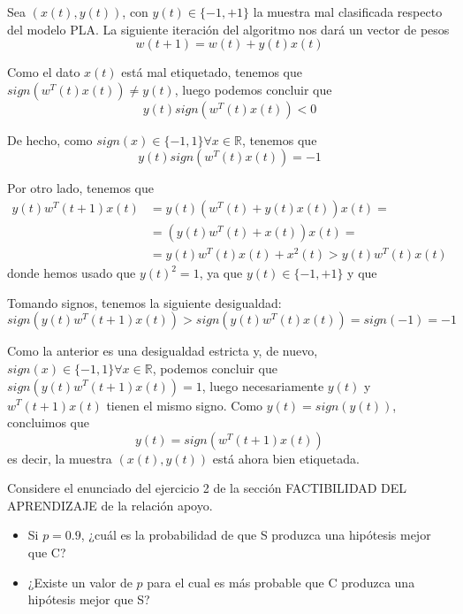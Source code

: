 \documentclass[a4paper, 11pt]{article}
\begin{document}
    \begin{solucion}
        Sea $(x(t), y(t))$, con $y(t) \in \{-1, +1\}$ la muestra mal clasificada respecto del modelo PLA. La siguiente iteración del algoritmo nos dará un vector de pesos
        \[
        w(t+1) = w(t) + y(t)x(t)
        \]

        Como el dato $x(t)$ está mal etiquetado, tenemos que $sign(w^T(t) x(t)) \neq y(t)$, luego podemos concluir que
        \[
        y(t) sign(w^T(t) x(t)) < 0
        \]

        De hecho, como $sign(x) \in \{-1, 1\} \forall x \in \mathbb{R}$, tenemos que
        \[
        y(t) sign(w^T(t) x(t)) = -1
        \]

        Por otro lado, tenemos que
        \begin{align*}
            y(t) w^T(t+1) x(t) &= y(t) (w^T(t) + y(t)x(t)) x(t) = \\
            &= (y(t)w^T(t) + x(t)) x(t) = \\
            &= y(t)w^T(t)x(t) + x^2(t) > y(t)w^T(t)x(t)
        \end{align*}
        donde hemos usado que $y(t)^2 = 1$, ya que $y(t) \in \{-1, +1\}$ y que

        Tomando signos, tenemos la siguiente desigualdad:
        \[
        sign(y(t) w^T(t+1) x(t)) > sign(y(t)w^T(t)x(t)) = sign(-1) = -1
        \]

        Como la anterior es una desigualdad estricta y, de nuevo, $sign(x) \in \{-1, 1\} \forall x \in \mathbb{R}$, podemos concluir que $sign(y(t) w^T(t+1) x(t)) = 1$, luego necesariamente $y(t)$ y $w^T(t+1) x(t)$ tienen el mismo signo. Como $y(t) = sign(y(t))$, concluimos que
        \[
        y(t) = sign(w^T(t+1) x(t))
        \]
        es decir, la muestra $(x(t), y(t))$ está ahora bien etiquetada.
    \end{solucion}


    \begin{ejercicio}
        Considere el enunciado del ejercicio 2 de la sección FACTIBILIDAD DEL APRENDIZAJE de la relación apoyo.
        \begin{itemize}
            \item Si $p = 0.9$, ¿cuál es la probabilidad de que S produzca una hipótesis mejor que C?
            \item ¿Existe un valor de $p$ para el cual es más probable que C produzca una hipótesis mejor que S?
        \end{itemize}
    \end{ejercicio}
\end{document}
